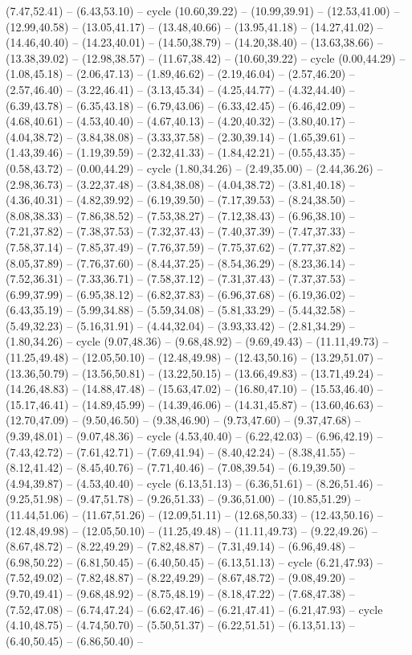 {(7.47,52.41) -- (6.43,53.10) -- cycle (10.60,39.22) -- (10.99,39.91) -- (12.53,41.00) -- (12.99,40.58) -- (13.05,41.17) -- (13.48,40.66) -- (13.95,41.18) -- (14.27,41.02) -- (14.46,40.40) -- (14.23,40.01) -- (14.50,38.79) -- (14.20,38.40) -- (13.63,38.66) -- (13.38,39.02) -- (12.98,38.57) -- (11.67,38.42) -- (10.60,39.22) -- cycle (0.00,44.29) -- (1.08,45.18) -- (2.06,47.13) -- (1.89,46.62) -- (2.19,46.04) -- (2.57,46.20) -- (2.57,46.40) -- (3.22,46.41) -- (3.13,45.34) -- (4.25,44.77) -- (4.32,44.40) -- (6.39,43.78) -- (6.35,43.18) -- (6.79,43.06) -- (6.33,42.45) -- (6.46,42.09) -- (4.68,40.61) -- (4.53,40.40) -- (4.67,40.13) -- (4.20,40.32) -- (3.80,40.17) -- (4.04,38.72) -- (3.84,38.08) -- (3.33,37.58) -- (2.30,39.14) -- (1.65,39.61) -- (1.43,39.46) -- (1.19,39.59) -- (2.32,41.33) -- (1.84,42.21) -- (0.55,43.35) -- (0.58,43.72) -- (0.00,44.29) -- cycle (1.80,34.26) -- (2.49,35.00) -- (2.44,36.26) -- (2.98,36.73) -- (3.22,37.48) -- (3.84,38.08) -- (4.04,38.72) -- (3.81,40.18) -- (4.36,40.31) -- (4.82,39.92) -- (6.19,39.50) -- (7.17,39.53) -- (8.24,38.50) -- (8.08,38.33) -- (7.86,38.52) -- (7.53,38.27) -- (7.12,38.43) -- (6.96,38.10) -- (7.21,37.82) -- (7.38,37.53) -- (7.32,37.43) -- (7.40,37.39) -- (7.47,37.33) -- (7.58,37.14) -- (7.85,37.49) -- (7.76,37.59) -- (7.75,37.62) -- (7.77,37.82) -- (8.05,37.89) -- (7.76,37.60) -- (8.44,37.25) -- (8.54,36.29) -- (8.23,36.14) -- (7.52,36.31) -- (7.33,36.71) -- (7.58,37.12) -- (7.31,37.43) -- (7.37,37.53) -- (6.99,37.99) -- (6.95,38.12) -- (6.82,37.83) -- (6.96,37.68) -- (6.19,36.02) -- (6.43,35.19) -- (5.99,34.88) -- (5.59,34.08) -- (5.81,33.29) -- (5.44,32.58) -- (5.49,32.23) -- (5.16,31.91) -- (4.44,32.04) -- (3.93,33.42) -- (2.81,34.29) -- (1.80,34.26) -- cycle (9.07,48.36) -- (9.68,48.92) -- (9.69,49.43) -- (11.11,49.73) -- (11.25,49.48) -- (12.05,50.10) -- (12.48,49.98) -- (12.43,50.16) -- (13.29,51.07) -- (13.36,50.79) -- (13.56,50.81) -- (13.22,50.15) -- (13.66,49.83) -- (13.71,49.24) -- (14.26,48.83) -- (14.88,47.48) -- (15.63,47.02) -- (16.80,47.10) -- (15.53,46.40) -- (15.17,46.41) -- (14.89,45.99) -- (14.39,46.06) -- (14.31,45.87) -- (13.60,46.63) -- (12.70,47.09) -- (9.50,46.50) -- (9.38,46.90) -- (9.73,47.60) -- (9.37,47.68) -- (9.39,48.01) -- (9.07,48.36) -- cycle (4.53,40.40) -- (6.22,42.03) -- (6.96,42.19) -- (7.43,42.72) -- (7.61,42.71) -- (7.69,41.94) -- (8.40,42.24) -- (8.38,41.55) -- (8.12,41.42) -- (8.45,40.76) -- (7.71,40.46) -- (7.08,39.54) -- (6.19,39.50) -- (4.94,39.87) -- (4.53,40.40) -- cycle (6.13,51.13) -- (6.36,51.61) -- (8.26,51.46) -- (9.25,51.98) -- (9.47,51.78) -- (9.26,51.33) -- (9.36,51.00) -- (10.85,51.29) -- (11.44,51.06) -- (11.67,51.26) -- (12.09,51.11) -- (12.68,50.33) -- (12.43,50.16) -- (12.48,49.98) -- (12.05,50.10) -- (11.25,49.48) -- (11.11,49.73) -- (9.22,49.26) -- (8.67,48.72) -- (8.22,49.29) -- (7.82,48.87) -- (7.31,49.14) -- (6.96,49.48) -- (6.98,50.22) -- (6.81,50.45) -- (6.40,50.45) -- (6.13,51.13) -- cycle (6.21,47.93) -- (7.52,49.02) -- (7.82,48.87) -- (8.22,49.29) -- (8.67,48.72) -- (9.08,49.20) -- (9.70,49.41) -- (9.68,48.92) -- (8.75,48.19) -- (8.18,47.22) -- (7.68,47.38) -- (7.52,47.08) -- (6.74,47.24) -- (6.62,47.46) -- (6.21,47.41) -- (6.21,47.93) -- cycle (4.10,48.75) -- (4.74,50.70) -- (5.50,51.37) -- (6.22,51.51) -- (6.13,51.13) -- (6.40,50.45) -- (6.86,50.40) -- }
